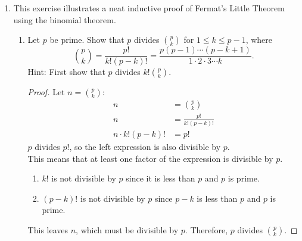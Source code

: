 \documentclass[11pt]{article}
\theoremstyle{definition}
\begin{document}
\begin{enumerate}
    \item This exercise illustrates a neat inductive proof of Fermat's Little Theorem using the binomial theorem.
    \begin{enumerate}
        \item Let $p$ be prime. Show that $p$ divides ${p\choose k}$ for $1\leq k\leq p-1$, where $${p\choose k} = \frac{p!}{k!(p-k)!} = \frac{p(p-1)\cdots(p-k+1)}{1\cdot2\cdot 3\cdots k}.$$ Hint: First show that $p$ divides $\displaystyle k! {p\choose k}$.
        \begin{proof}
            Let $n={p\choose k}$:
            \begin{align*}
                n &= {p\choose k} \\
                n &= \frac{p!}{k!(p-k)!} \\
                n\cdot k!(p-k)! &= p! 
            \end{align*}
            $p$ divides $p!$, so the left expression is also divisible by $p$. \\
            This means that at least one factor of the expression is divisible by $p$.
            \begin{enumerate}
                \item $k!$ is not divisible by $p$ since it is less than $p$ and $p$ is prime.
                \item $(p-k)!$ is not divisible by $p$ since $p-k$ is less than $p$ and $p$ is prime.
            \end{enumerate}
            This leaves $n$, which must be divisible by $p$. Therefore, $p$ divides ${p\choose k}$.
        \end{proof}


\end{enumerate}
\end{enumerate}
\end{document}
